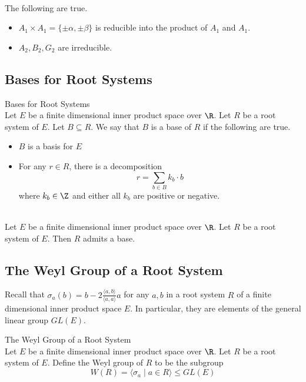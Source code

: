 \documentclass[a4paper]{article}
\begin{document}
\begin{eg}{}{} \\The following are true. 
\begin{itemize}
\item $A_1\times A_1=\{\pm\alpha,\pm\beta\}$ is reducible into the product of $A_1$ and $A_1$. 
\item $A_2,B_2,G_2$ are irreducible. 
\end{itemize}
\end{eg}

\subsection{Bases for Root Systems}
\begin{defn}{Bases for Root Systems}{} \\Let $E$ be a finite dimensional inner product space over $\R$. Let $R$ be a root system of $E$. Let $B\subseteq R$. We say that $B$ is a base of $R$ if the following are true. 
\begin{itemize}
\item $B$ is a basis for $E$
\item For any $r\in R$, there is a decomposition $$r=\sum_{b\in B}k_b\cdot b$$ where $k_b\in\Z$ and either all $k_b$ are positive or negative. 
\end{itemize}
\end{defn}

\begin{prp}{}{} \\Let $E$ be a finite dimensional inner product space over $\R$. Let $R$ be a root system of $E$. Then $R$ admits a base. 
\end{prp}

\subsection{The Weyl Group of a Root System}
Recall that $\sigma_a(b)=b-2\frac{\langle a,b\rangle}{\langle a,a\rangle}a$ for any $a,b$ in a root system $R$ of a finite dimensional inner product space $E$. In particular, they are elements of the general linear group $GL(E)$. 

\begin{defn}{The Weyl Group of a Root System}{} \\Let $E$ be a finite dimensional inner product space over $\R$. Let $R$ be a root system of $E$. Define the Weyl group of $R$ to be the subgroup $$W(R)=\langle\sigma_a\;|\;a\in R\rangle\leq GL(E)$$
\end{defn}
\end{document}
